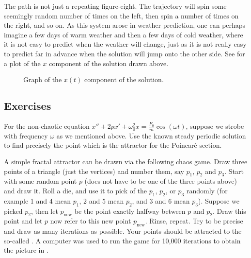 \documentclass[12pt]{book}
\begin{document}
The path is not just a repeating figure-eight.  The trajectory will spin some
seemingly random number of times on the left, then spin a number of times on
the right, and so on.  As this system arose in weather prediction, one can
perhaps imagine a few days of warm weather and then a few days of cold
weather, where it is not easy to predict when the weather will change,
just as it is not really easy to predict far in advance when the solution
will jump onto the other side.  See  for a
plot of the $x$ component of the solution drawn above.

\begin{figure}[h!t]
\capstart
\begin{center}
\caption{Graph of the $x(t)$ component of the solution.
\label{nlin:lorenz-graphx}}
\end{center}
\end{figure}

\subsection{Exercises}

\begin{exercise}
For the non-chaotic equation
$x''+2p x' + \omega_0^2 x = \frac{F_0}{m} \cos (\omega t)$, suppose we
strobe with frequency $\omega$ as we mentioned above.  Use the known
steady periodic solution to find precisely the point which is the attractor
for the Poincar\`e section.
\end{exercise}

\begin{exercise}[project]
A simple fractal attractor can be drawn via the following chaos game.  Draw three
points of a triangle (just the vertices) and number them, say $p_1$, $p_2$
and $p_3$.  Start with some
random point $p$ (does not have to be one of the three points above) and
draw it.  Roll a die, and use it to pick of the $p_1$, $p_2$, or $p_3$
randomly (for example 1 and 4 mean $p_1$, 2 and 5 mean $p_2$, and 3 and 6
mean $p_3$).  Suppose we picked $p_2$, then let $p_{\text{new}}$ be the
point exactly halfway between $p$ and $p_2$.  Draw this point and let $p$
now refer to this new point $p_{\text{new}}$.  Rinse, repeat.  Try to be
precise and draw as many iterations as possible.  Your points should be
attracted to the so-called \emph{}.  A computer
was used to run the game for 10,000 iterations to obtain the picture in
.
\end{exercise}
\end{document}
